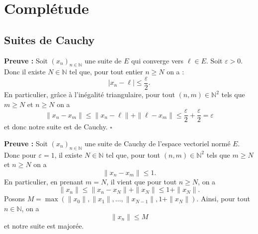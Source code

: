 \documentclass{article}
\begin{document}



\section{Complétude}
\subsection{Suites de Cauchy}


\noindent\textbf{Preuve :} Soit $(x_n)_{n \in \mathbb{N}}$ une suite de $E$ qui converge vers $\ell \in E$. Soit $\varepsilon > 0$. Donc il existe $N \in \mathbb{N}$ tel que, pour tout entier $n \ge N$ on a :
\[
|x_n - \ell| \le \frac{\varepsilon}{2}.
\]
En particulier, grâce à l'inégalité triangulaire, pour tout $(n, m) \in \mathbb{N}^2$ tels que $m \ge N$ et $n \ge N$ on a
\[
\|x_n - x_m\| \le \|x_n - \ell\| + \|\ell - x_m\| \le \frac{\varepsilon}{2} + \frac{\varepsilon}{2} = \varepsilon
\]
et donc notre suite est de Cauchy. \hfill $\square$


\noindent\textbf{Preuve :} Soit $(x_n)_{n \in \mathbb{N}}$ une suite de Cauchy de l'espace vectoriel normé $E$. Donc pour $\varepsilon = 1$, il existe $N \in \mathbb{N}$ tel que, pour tout $(n, m) \in \mathbb{N}^2$ tels que $m \ge N$ et $n \ge N$ on a
\[
\|x_n - x_m\| \le 1.
\]
En particulier, en prenant $m = N$, il vient que pour tout $n \ge N$, on a
\[
\|x_n\| \le \|x_n - x_N\| + \|x_N\| \le 1 + \|x_N\|.
\]
Posons $M = \max(\|x_0\|, \|x_1\|, \dots, \|x_{N-1}\|, 1 + \|x_N\|)$. Ainsi, pour tout $n \in \mathbb{N}$, on a
\[
\|x_n\| \le M
\]
et notre suite est majorée.
\end{document}
